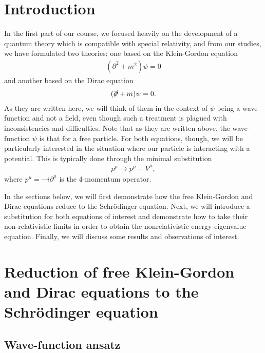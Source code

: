 
\def\HWnum{Midterm Notes}
\def\duedate{November 6, 2024}



\section{Introduction}
\label{sec:introduction}

In the first part of our course, we focused heavily on the development of a quantum theory which is compatible with special relativity, and from our studies, we have formulated two theories: one based on the Klein-Gordon equation
\begin{align}
    ( \partial^2 + m^2 ) \psi = 0
\end{align}
and another based on the Dirac equation
\begin{align}
    ( \slashed{\partial} + m ) \psi = 0
.\end{align}
As they are written here, we will think of them in the context of $\psi$ being a wave-function and not a field, even though such a treatment is plagued with inconsistencies and difficulties.
Note that as they are written above, the wave-function $\psi$ is that for a free particle.
For both equations, though, we will be particularly interested in the situation where our particle is interacting with a potential.
This is typically done through the minimal substitution
\begin{align}
    p^{\mu} \rightarrow p^{\mu} - V^{\mu}
,\end{align}
where $p^{\mu} = - i \partial^{\mu}$ is the 4-momentum operator.

In the sections below, we will first demonstrate how the free Klein-Gordon and Dirac equations reduce to the Schr\"{o}dinger equation.
Next, we will introduce a substitution for both equations of interest and demonstrate how to take their non-relativistic limits in order to obtain the nonrelativistic energy eigenvalue equation.
Finally, we will discuss some results and observations of interest.


\section{Reduction of free Klein-Gordon and Dirac equations to the Schr\"{o}dinger equation}
\label{sec:reduction-of-free-KG-and-dirac-eq-to-the-SE}


\subsection{Wave-function ansatz}

